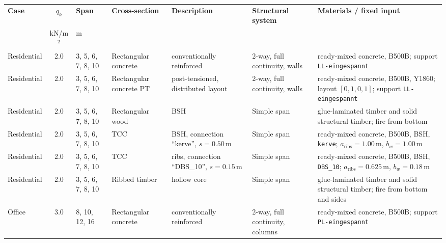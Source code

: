\begin{table}[t]
    \centering
    \begingroup
    \scriptsize
    \setlength{\tabcolsep}{2.5pt}
    \renewcommand{\arraystretch}{1.15}
    \begin{tabularx}{\textwidth}{@{}l|c|l|X|X|X|X@{}}
    \hline
    \textbf{Case} &
    \textbf{$q_k$} &
    \textbf{Span} &
    \textbf{Cross-section} &
    \textbf{Description} &
    \textbf{Structural system} &
    \textbf{Materials / fixed input} \\
    & kN/m$^2$ & m & & & & \\ \hline
    Residential & 2.0 & 3, 5, 6, 7, 8, 10 &
    Rectangular concrete &
    conventionally reinforced &
    2-way, full continuity, walls &
    ready-mixed concrete, B500B; support \texttt{LL-eingespannt} \\

    Residential & 2.0 & 3, 5, 6, 7, 8, 10 &
    Rectangular concrete PT &
    post-tensioned, distributed layout &
    2-way, full continuity, walls &
    ready-mixed concrete, B500B, Y1860; layout $[0,1,0,1]$; support \texttt{LL-eingespannt} \\

    Residential & 2.0 & 3, 5, 6, 7, 8, 10 &
    Rectangular wood &
    BSH &
    Simple span &
    glue-laminated timber and solid structural timber; fire from bottom \\

    Residential & 2.0 & 3, 5, 6, 7, 8, 10 &
    TCC &
    BSH, connection ``kerve'', $s=0.50$\,m &
    Simple span &
    ready-mixed concrete, B500B, BSH, \texttt{kerve}; $a_{\mathrm{ribs}}=1.00$\,m, $b_w=1.00$\,m \\

    Residential & 2.0 & 3, 5, 6, 7, 8, 10 &
    TCC &
    ribs, connection ``DBS\_10'', $s=0.15$\,m &
    Simple span &
    ready-mixed concrete, B500B, BSH, \texttt{DBS\_10}; $a_{\mathrm{ribs}}=0.625$\,m, $b_w=0.18$\,m \\

    Residential & 2.0 & 3, 5, 6, 7, 8, 10 &
    Ribbed timber &
    hollow core &
    Simple span &
    glue-laminated timber and solid structural timber; fire from bottom and sides \\

    Office & 3.0 & 8, 10, 12, 16 &
    Rectangular concrete &
    conventionally reinforced &
    2-way, full continuity, columns &
    ready-mixed concrete, B500B; support \texttt{PL-eingespannt} \\


\end{tabularx}
\end{table}
